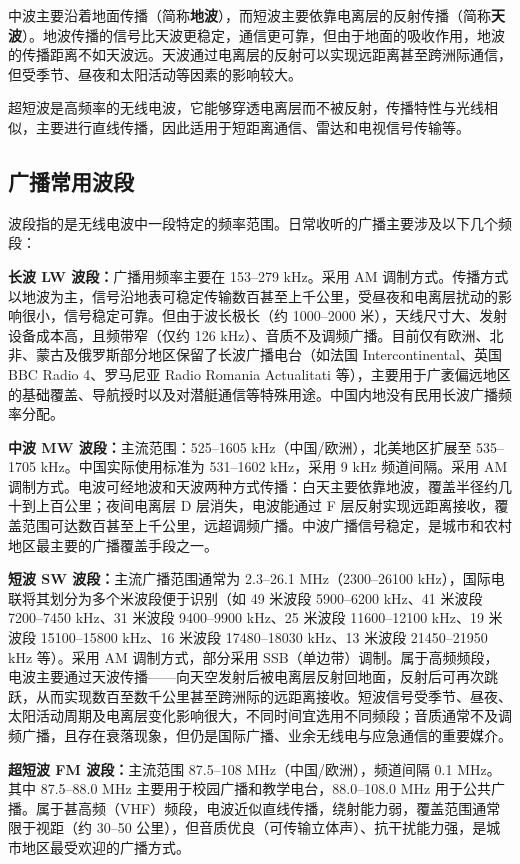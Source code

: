 \documentclass[12pt,UTF8]{ctexbook}
\begin{document}
中波主要沿着地面传播（简称\textbf{地波}），而短波主要依靠电离层的反射传播（简称\textbf{天波}）。地波传播的信号比天波更稳定，通信更可靠，但由于地面的吸收作用，地波的传播距离不如天波远。天波通过电离层的反射可以实现远距离甚至跨洲际通信，但受季节、昼夜和太阳活动等因素的影响较大。

超短波是高频率的无线电波，它能够穿透电离层而不被反射，传播特性与光线相似，主要进行直线传播，因此适用于短距离通信、雷达和电视信号传输等。

\subsection{广播常用波段}

波段指的是无线电波中一段特定的频率范围。日常收听的广播主要涉及以下几个频段：

\textbf{长波 LW 波段：}广播用频率主要在 153–279 kHz。采用 AM 调制方式。传播方式以地波为主，信号沿地表可稳定传输数百甚至上千公里，受昼夜和电离层扰动的影响很小，信号稳定可靠。但由于波长极长（约 1000–2000 米），天线尺寸大、发射设备成本高，且频带窄（仅约 126 kHz）、音质不及调频广播。目前仅有欧洲、北非、蒙古及俄罗斯部分地区保留了长波广播电台（如法国 Intercontinental、英国 BBC Radio 4、罗马尼亚 Radio Romania Actualitati 等），主要用于广袤偏远地区的基础覆盖、导航授时以及对潜艇通信等特殊用途。中国内地没有民用长波广播频率分配。

\textbf{中波 MW 波段：}主流范围：525–1605 kHz（中国/欧洲），北美地区扩展至 535–1705 kHz。中国实际使用标准为 531–1602 kHz，采用 9 kHz 频道间隔。采用 AM 调制方式。电波可经地波和天波两种方式传播：白天主要依靠地波，覆盖半径约几十到上百公里；夜间电离层 D 层消失，电波能通过 F 层反射实现远距离接收，覆盖范围可达数百甚至上千公里，远超调频广播。中波广播信号稳定，是城市和农村地区最主要的广播覆盖手段之一。

\textbf{短波 SW 波段：}主流广播范围通常为 2.3–26.1 MHz（2300–26100 kHz），国际电联将其划分为多个米波段便于识别（如 49 米波段 5900–6200 kHz、41 米波段 7200–7450 kHz、31 米波段 9400–9900 kHz、25 米波段 11600–12100 kHz、19 米波段 15100–15800 kHz、16 米波段 17480–18030 kHz、13 米波段 21450–21950 kHz 等）。采用 AM 调制方式，部分采用 SSB（单边带）调制。属于高频频段，电波主要通过天波传播——向天空发射后被电离层反射回地面，反射后可再次跳跃，从而实现数百至数千公里甚至跨洲际的远距离接收。短波信号受季节、昼夜、太阳活动周期及电离层变化影响很大，不同时间宜选用不同频段；音质通常不及调频广播，且存在衰落现象，但仍是国际广播、业余无线电与应急通信的重要媒介。

\textbf{超短波 FM 波段：}主流范围 87.5–108 MHz（中国/欧洲），频道间隔 0.1 MHz。其中 87.5–88.0 MHz 主要用于校园广播和教学电台，88.0–108.0 MHz 用于公共广播。属于甚高频（VHF）频段，电波近似直线传播，绕射能力弱，覆盖范围通常限于视距（约 30–50 公里），但音质优良（可传输立体声）、抗干扰能力强，是城市地区最受欢迎的广播方式。
\end{document}
